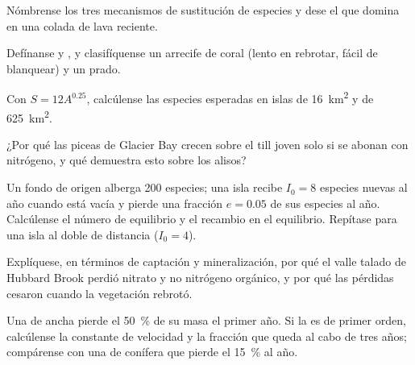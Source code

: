 \begin{exercise}[$\star$]\label{exo:b1:ecosystem-dynamics:2}
Nómbrense los tres mecanismos de sustitución de especies y dese el que
domina en una colada de lava reciente.
\end{exercise}

\begin{exercise}[$\star$]\label{exo:b1:ecosystem-dynamics:3}
Defínanse  y , y clasifíquense un arrecife de coral
(lento en rebrotar, fácil de blanquear) y un prado.
\end{exercise}

\begin{exercise}[$\star$]\label{exo:b1:ecosystem-dynamics:4}
Con $S = 12 A^{0.25}$, calcúlense las especies esperadas en islas de
\qty{16}{km^2} y de \qty{625}{km^2}.
\end{exercise}

\begin{exercise}[$\star\star$]\label{exo:b1:ecosystem-dynamics:5}
¿Por qué las piceas de Glacier Bay crecen sobre el till joven solo si se
abonan con nitrógeno, y qué demuestra esto sobre los alisos?
\end{exercise}

\begin{exercise}[$\star\star$]\label{exo:b1:ecosystem-dynamics:6}
Un fondo de origen alberga 200 especies; una isla recibe $I_0 = 8$ especies
nuevas al año cuando está vacía y pierde una fracción $e = 0.05$ de sus
especies al año. Calcúlense el número de equilibrio y el recambio en el
equilibrio. Repítase para una isla al doble de distancia ($I_0 = 4$).
\end{exercise}

\begin{exercise}[$\star\star$]\label{exo:b1:ecosystem-dynamics:7}
Explíquese, en términos de captación y mineralización, por qué el valle
talado de Hubbard Brook perdió nitrato y no nitrógeno orgánico, y por qué
las pérdidas cesaron cuando la vegetación rebrotó.
\end{exercise}

\begin{exercise}[$\star\star$]\label{exo:b1:ecosystem-dynamics:8}
Una  de  ancha pierde el \qty{50}{\%} de su masa el primer año.
Si la  es de primer orden, calcúlense la constante de
velocidad y la fracción que queda al cabo de tres años; compárense con una
 de conífera que pierde el \qty{15}{\%} al año.
\end{exercise}

